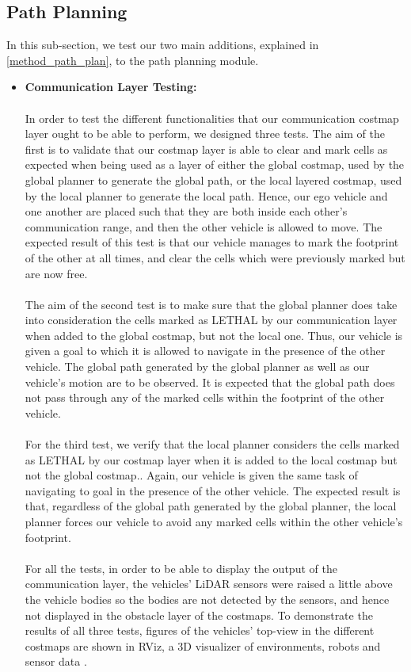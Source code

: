 \subsection{Path Planning}
\label{test_path_plan}
In this sub-section, we test our two main additions, explained in \ref{method_path_plan}, to the path planning module.

\begin{itemize}
    \item \textbf{Communication Layer Testing:} 
    \\ \\
    In order to test the different functionalities that our communication costmap layer ought to be able to perform, we designed three tests. The aim of the first is to validate that our costmap layer is able to clear and mark cells as expected when being used as a layer of either the global costmap, used by the global planner to generate the global path, or the local layered costmap, used by the local planner to generate the local path. Hence, our ego vehicle and one another are placed such that they are both inside each other’s communication range, and then the other vehicle is allowed to move. The expected result of this test is that our vehicle manages to mark the footprint of the other at all times, and clear the cells which were previously marked but are now free. 
    \\ \\
    The aim of the second test is to make sure that the global planner does take into consideration the cells marked as LETHAL by our communication layer when added to the global costmap, but not the local one. Thus, our vehicle is given a goal to which it is allowed to navigate in the presence of the other vehicle. The global path generated by the global planner as well as our vehicle’s motion are to be observed. It is expected that the global path does not pass through any of the marked cells within the footprint of the other vehicle. 
    \\ \\
    For the third test, we verify that the local planner considers the cells marked as LETHAL by our costmap layer when it is added to the local costmap but not the global costmap.. Again, our vehicle is given the same task of navigating  to goal in the presence of the other vehicle. The expected result is that, regardless of the global path generated by the global planner, the local planner forces our vehicle to avoid any marked cells within the other vehicle’s footprint. 
    \\ \\
    For all the tests, in order to be able to display the output of the communication layer, the vehicles’ LiDAR sensors were raised a little above the vehicle bodies so the bodies are not detected by the sensors, and hence not displayed in the obstacle layer of the costmaps. To demonstrate the results of all three tests, figures of the vehicles’ top-view in the different costmaps are shown in RViz, a 3D visualizer of environments, robots and sensor data \cite{RVizarticle}.
    

\end{itemize}
